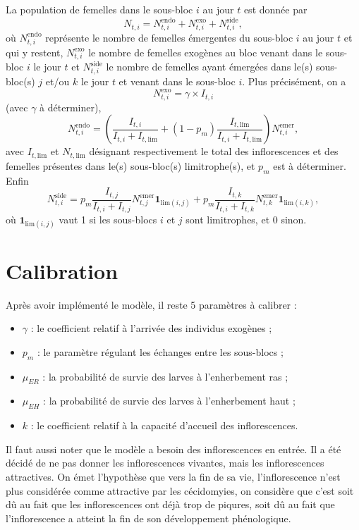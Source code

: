 \documentclass[a4paper, 11pt]{article}
\begin{document}
La population de femelles dans le sous-bloc $i$ au jour $t$ est donnée par
$$
N_{t, i} = N^{\text{endo}}_{t, i} + N^{\text{exo}}_{t, i}  + N^{\text{side}}_{t, i},
$$
où $N^{\text{endo}}_{t, i}$ représente le nombre de femelles émergentes du sous-bloc $i$ au jour $t$ et qui y restent, $N^{\text{exo}}_{t, i}$ le nombre de femelles exogènes au bloc venant dans le sous-bloc $i$ le jour $t$ et $N^{\text{side}}_{t, i}$ le nombre de femelles ayant émergées dans le(s) sous-bloc(s) $j$ et/ou $k$ le jour $t$ et venant dans le sous-bloc $i$.
Plus précisément, on a 
$$
N^{\text{exo}}_{t, i} = \gamma \times I_{t, i}
$$
(avec $\gamma$ à déterminer),
$$
 N^{\text{endo}}_{t, i} = \left(\frac{I_{t, i}}{I_{t, i} + I_{t, \text{lim}}} + \left( 1-p_m \right)\frac{I_{t, \text{lim}}}{I_{t, i} + I_{t, \text{lim}}}\right) N^{\text{emer}}_{t, i}, 
$$
avec $I_{t, \text{lim}}$ et $N_{t, \text{lim}}$ désignant respectivement le total des inflorescences et des femelles présentes dans le(s) sous-bloc(s) limitrophe(s), et  $p_m$ est à déterminer. Enfin
$$
N^{\text{side}}_{t, i} = p_m \frac{I_{t, j}}{I_{t, i} + I_{t, j}} N^{\text{emer}}_{t, j} \mathbf{1}_{\text{lim}(i, j)} +p_m \frac{I_{t, k}}{I_{t, i} + I_{t, k}} N^{\text{emer}}_{t, k} \mathbf{1}_{\text{lim}(i, k)},
$$
où $\mathbf{1}_{\text{lim}(i, j)}$ vaut 1 si les sous-blocs $i$ et $j$ sont limitrophes, et 0 sinon.

\section{Calibration}

Après avoir implémenté le modèle, il reste 5 paramètres à calibrer :
\begin{itemize}
 \item $\gamma$ : le coefficient relatif à l'arrivée des individus exogènes ;
 \item $p_m$ : le paramètre régulant les échanges entre les sous-blocs ;
 \item $\mu_{ER}$ : la probabilité de survie des larves à l'enherbement ras ;
 \item $\mu_{EH}$ : la probabilité de survie des larves à l'enherbement haut ;
 \item $k$ : le coefficient relatif à la capacité d'accueil des inflorescences.
\end{itemize}

Il faut aussi noter que le modèle a besoin des inflorescences en entrée. Il a été décidé de ne pas donner les inflorescences vivantes, mais les inflorescences attractives. On émet l'hypothèse que vers la fin de sa vie, l'inflorescence n'est plus considérée comme attractive par les cécidomyies, on considère que c'est soit dû au fait que les inflorescences ont déjà trop de piqures, soit dû au fait que l'inflorescence a atteint la fin de son développement phénologique.
\end{document}
